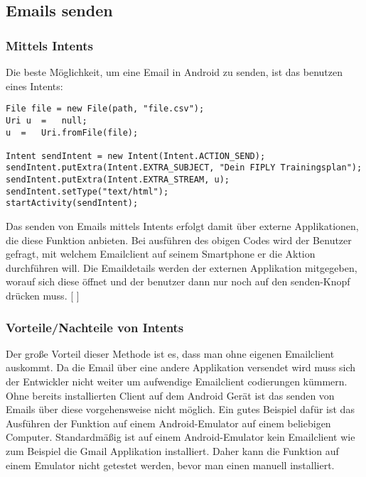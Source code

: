 \documentclass[FIPLY_base.tex]{subfiles}
\begin{document}
\subsection{Emails senden}
\subsubsection{Mittels Intents}
Die beste Möglichkeit, um eine Email in Android zu senden, ist das benutzen eines Intents:
\begin{lstlisting}[caption={Verwendung von CSVWriter: Möglichkeit 2, alles auf einmal},label=DescriptiveLabel]
File file = new File(path, "file.csv");
Uri u  =   null;
u  =   Uri.fromFile(file);

Intent sendIntent = new Intent(Intent.ACTION_SEND);
sendIntent.putExtra(Intent.EXTRA_SUBJECT, "Dein FIPLY Trainingsplan");
sendIntent.putExtra(Intent.EXTRA_STREAM, u);
sendIntent.setType("text/html");
startActivity(sendIntent);
\end{lstlisting}
Das senden von Emails mittels Intents erfolgt damit über externe Applikationen, die diese Funktion anbieten. Bei ausführen des obigen Codes wird der Benutzer gefragt, mit welchem Emailclient auf seinem Smartphone er die Aktion durchführen will. Die Emaildetails werden der externen Applikation mitgegeben, worauf sich diese öffnet und der benutzer dann nur noch auf den \grqq{}senden\grqq{}-Knopf drücken muss. [ \cite{exportCSVsendMail}]
\subsubsection{Vorteile/Nachteile von Intents}
Der große Vorteil dieser Methode ist es, dass man ohne eigenen Emailclient auskommt. Da die Email über eine andere Applikation versendet wird muss sich der Entwickler nicht weiter um aufwendige Emailclient codierungen kümmern. 
\ \\
Ohne bereits installierten Client auf dem Android Gerät ist das senden von Emails über diese vorgehensweise nicht möglich. Ein gutes Beispiel dafür ist das Ausführen der Funktion auf einem Android-Emulator auf einem beliebigen Computer. Standardmäßig ist auf einem Android-Emulator kein Emailclient wie zum Beispiel die Gmail Applikation installiert. Daher kann die Funktion auf einem Emulator nicht getestet werden, bevor man einen manuell installiert. 
\ \\
\end{document}
